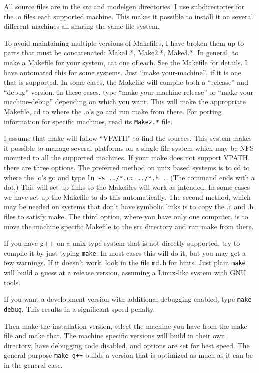 All source files are in the src and modelgen directories.  I use
subdirectories for the .o files each supported machine.  This makes it
possible to install it on several different machines all sharing the
same file system.

To avoid maintaining multiple versions of Makefiles, I have broken
them up to parts that must be concatenated: Make1.*, Make2.*, Make3.*.
In general, to make a Makefile for your system, cat one of each.  See
the Makefile for details.  I have automated this for some systems.
Just ``make your-machine'', if it is one that is supported.  In some
cases, the Makefile will compile both a ``release'' and ``debug''
version.  In these cases, type ``make your-machine-release'' or ``make
your-machine-debug'' depending on which you want.  This will make the
appropriate Makefile, cd to where the .o's go and run make from there.
For porting information for specific machines, read its {\tt Make2.*}
file.

I assume that make will follow ``VPATH'' to find the sources.  This
system makes it possible to manage several platforms on a single file
system which may be NFS mounted to all the supported machines.  If
your make does not support VPATH, there are three options.  The
preferred method on unix based systems is to cd to where the .o's go
and type {\tt ln -s ../*.cc ../*.h .}.  (The command ends with a dot.)
This will set up links so the Makefiles will work as intended.  In
some cases we have set up the Makefile to do this automatically.  The
second method, which may be needed on systems that don't have symbolic
links is to copy the .c and .h files to satisfy make.  The third
option, where you have only one computer, is to move the machine
specific Makefile to the src directory and run make from there.

If you have g++ on a unix type system that is not directly supported,
try to compile it by just typing {\tt make}.  In most cases this will
do it, but you may get a few warnings.  If it doesn't work, look in
the file {\tt md.h} for hints.  Just plain {\tt make} will build a
guess at a release version, assuming a Linux-like system with GNU
tools.

If you want a development version with additional debugging enabled,
type {\tt make debug}.  This results in a significant speed penalty.

Then make the installation version, select the machine you have from
the make file and make that.  The machine specific versions will
build in their own directory, have debugging code disabled, and
options are set for best speed.  The general purpose {\tt make g++}
builds a version that is optimized as much as it can be in the
general case.

